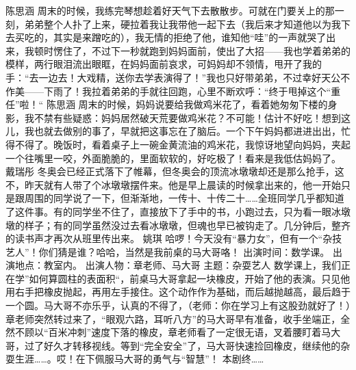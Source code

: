 {}\markdownRendererInterblockSeparator
{}陈思涵\markdownRendererInterblockSeparator
{}周末的时候，我练完琴想趁着好天气下去散散步。可就在门要关上的那一刻，弟弟整个人扑了上来，硬拉着我让我带他一起下去（我后来才知道他以为我下去买吃的，其实是来蹭吃的），我无情的拒绝了他，谁知他“哇”的一声就哭了出来，我顿时愣住了，不过下一秒就跑到妈妈面前，使出了大招——我也学着弟弟的模样，两行眼泪流出眼眶，在妈妈面前哀求，可妈妈却不领情，甩开了我的手：“去一边去！大戏精，送你去学表演得了！”我也只好带弟弟，不过幸好天公不作美——下雨了！我拉着弟弟的手就往回跑，心里不断欢呼：“终于甩掉这个“重任”啦！“\markdownRendererInterblockSeparator
{}\markdownRendererInterblockSeparator
{}陈思涵\markdownRendererInterblockSeparator
{}周末的时候，妈妈说要给我做鸡米花了，看着她匆匆下楼的身影，我不禁有些疑惑：妈妈居然破天荒要做鸡米花？不可能！估计不好吃！想到这儿，我也就去做别的事了，早就把这事忘在了脑后。一个下午妈妈都进进出出，忙得不得了。晚饭时，看着桌子上一碗金黄流油的鸡米花，我惊讶地望向妈妈，夹起一个往嘴里一咬，外面脆脆的，里面软软的，好吃极了！看来是我低估妈妈了。\markdownRendererInterblockSeparator
{}\markdownRendererInterblockSeparator
{}戴瑞彤\markdownRendererInterblockSeparator
{}冬奥会已经正式落下了帷幕，但冬奥会的顶流冰墩墩却还是那么抢手，这不，昨天就有人带了个冰墩墩摆件来。他是早上晨读的时候拿出来的，他一开始只是跟周围的同学说了一下，但渐渐地，一传十、十传二十……全班同学几乎都知道了这件事。有的同学坐不住了，直接放下了手中的书，小跑过去，只为看一眼冰墩墩的样子；有的同学虽然没过去看冰墩墩，但魂也早已被钩走了。几分钟后，整齐的读书声才再次从班里传出来。\markdownRendererInterblockSeparator
{}\markdownRendererInterblockSeparator
{}姚琪\markdownRendererInterblockSeparator
{}哈啰！今天没有“暴力女”，但有一个“杂技艺人”！你们猜是谁？哈哈，当然是我前桌的马大哥咯！\markdownRendererInterblockSeparator
{}出演时间：数学课。 出演地点：教室内。\markdownRendererInterblockSeparator
{}出演人物：章老师、马大哥 主题：杂耍艺人\markdownRendererInterblockSeparator
{}数学课上，我们正在学”如何算圆柱的表面积“，前桌马大哥拿起一块橡皮，开始了他的表演。只见他用右手把橡皮抛起，再用左手接住。这个动作作为基础，而后越抛越高，最后趋于一个圆。马大哥不亦乐乎，认真的不得了，（老师：你在学习上有这股劲就好了！）章老师突然转过来了，“眼观六路，耳听八方”的马大哥早有准备，收手坐端正，全然不顾以“百米冲刺”速度下落的橡皮，章老师看了一定很无语，叉着腰盯着马大哥，过了好久才转移视线。等到“完全安全”了，马大哥快速捡回橡皮，继续他的杂耍生涯……。哎！在下佩服马大哥的勇气与“智慧”！ 本剧终……\markdownRendererInterblockSeparator
